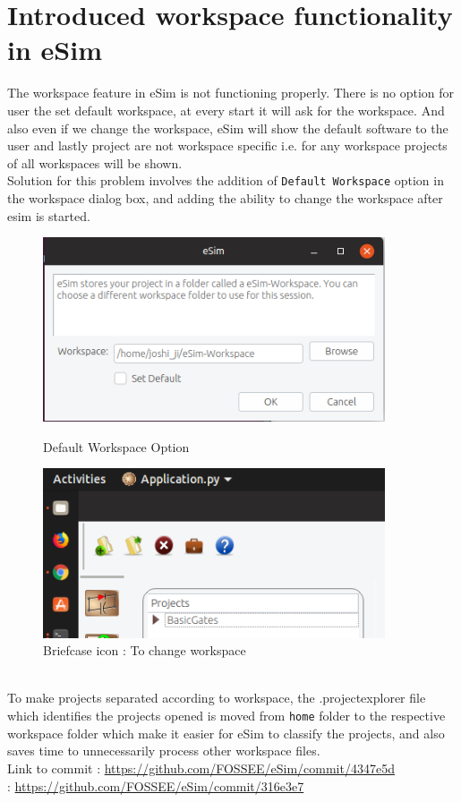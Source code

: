 \documentclass[12pt,a4paper]{report}
\begin{document}
\section{Introduced workspace functionality in eSim}
The workspace feature in eSim is not functioning properly. There is no option for user the set default workspace, at every start it will ask for the workspace. And also even if we change the workspace, eSim will show the default software to the user and lastly project are not workspace specific i.e. for any workspace projects of all workspaces will be shown.
\\
Solution for this problem involves the addition of \texttt{Default Workspace} option in the workspace dialog box, and adding the ability to change the workspace after esim is started.
\begin{figure}[h]
	\centering
	\begin{minipage}{0.45\textwidth}
		\centering
		\includegraphics[width=0.9\textwidth]{esim1}
		\caption{Default Workspace Option}
	\end{minipage}\hfill
	\begin{minipage}{0.45\textwidth}
		\centering
		\includegraphics[width=0.9\textwidth]{esim2}
		\caption{Briefcase icon : To change workspace}
	\end{minipage}
\end{figure}
\\
To make projects separated according to workspace, the .projectexplorer file which identifies the projects opened is moved from \texttt{home} folder to the respective workspace folder which make it easier for eSim to classify the projects, and also saves time to unnecessarily process other workspace files.
\vspace{3mm}
\\
Link to commit : \url{https://github.com/FOSSEE/eSim/commit/4347e5d}
\\
\hspace*{28mm} : \url{https://github.com/FOSSEE/eSim/commit/316e3e7}
\\ 
\end{document}
